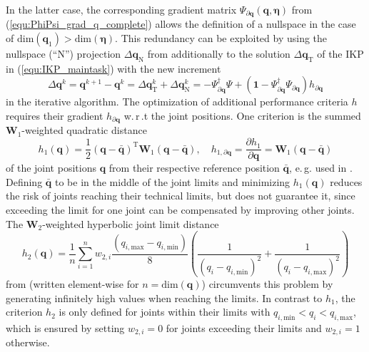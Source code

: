 \documentclass[robotics,article,submit,moreauthors,pdftex]{Definitions/mdpi}
\newcommand{\bm}[1]{\boldsymbol{#1}}
\newcommand{\transp}[0]{{\mathrm{T}}}
\let\Psi\varPsi
\begin{document}
In the latter case, the corresponding gradient matrix $\bm{\Psi}_{\partial \bm{q}}(\bm{q},\bm{\eta})$ from (\ref{equ:PhiPsi_grad_q_complete}) allows the definition of a nullspace in the case of $\mathrm{dim}(\bm{q}_1)>\mathrm{dim}(\bm{\eta})$.
This redundancy can be exploited by using the nullspace (``N'') projection ${\Delta}\bm{q}_{\mathrm{N}}$ from \cite{Yoshikawa1984} additionally to the solution ${\Delta}\bm{q}_{\mathrm{T}}$ of the IKP in (\ref{equ:IKP_maintask}) with the new increment
%
\begin{equation}
{\Delta}\bm{q}^{k}
=
\bm{q}^{k+1} - \bm{q}^k
=
{\Delta}\bm{q}_{\mathrm{T}}^k + {\Delta}\bm{q}_{\mathrm{N}}^k
=
-\bm{\Psi}_{\partial\bm{q}}^{\dagger} \bm{\Psi} + (\bm{1}-\bm{\Psi}_{\partial\bm{q}}^{\dagger}\bm{\Psi}_{\partial\bm{q}}) h_{\partial\bm{q}}
\label{equ:nullspace}
\end{equation}
%
in the iterative algorithm.
The optimization of additional performance criteria $h$ requires their gradient $h_{\partial\bm{q}}$ w.\,r\,.t the joint positions.
One criterion is the summed $\bm{W}_1$-weighted quadratic distance
%
\begin{equation}
h_1(\bm{q})
=
\frac{1}{2} (\bm{q}-\bar{\bm{q}})^\transp\bm{W}_1(\bm{q}-\bar{\bm{q}}),
\quad
h_{1,\partial\bm{q}}
=
\frac{\partial h_1}{\partial \bm{q}}
=
\bm{W}_1(\bm{q}-\bar{\bm{q}})
\label{equ:criterion1}
\end{equation}
%
of the joint positions $\bm{q}$ from their respective reference position $\bar{\bm{q}}$, e.\,g. used in \cite{HuoBar2005,HuoBar2008}.
Defining $\bar{\bm{q}}$ to be in the middle of the joint limits and minimizing $h_1(\bm{q})$ reduces the risk of joints reaching their technical limits, but does not guarantee it, since exceeding the limit for one joint can be compensated by improving other joints.
The $\bm{W}_{2}$-weighted hyperbolic joint limit distance
%
\begin{equation}
h_2(\bm{q})
=
\frac{1}{n} \sum_{i=1}^{n}
w_{2,i}
\frac{(q_{i,\mathrm{max}}-q_{i,\mathrm{min}})}{8}
\left(
\frac{1}{(q_{i}-q_{i,\mathrm{min}})^2}
+
\frac{1}{(q_{i}-q_{i,\mathrm{max}})^2}
\right)
\label{equ:criterion2}
\end{equation}
%
from \cite{ZhuQuCaoYan2013} (written element-wise for $n=\mathrm{dim}(\bm{q})$) circumvents this problem by generating infinitely high values when reaching the limits.
In contrast to $h_1$, the criterion $h_2$ is only defined for joints within their limits with $q_{i,\mathrm{min}} < q_i < q_{i,\mathrm{max}}$, which is ensured by setting $w_{2,i}=0$ for joints exceeding their limits and $w_{2,i}=1$ otherwise.
\end{document}
